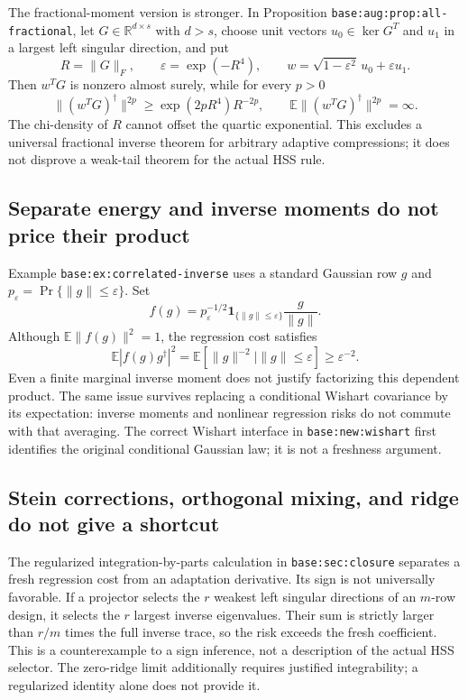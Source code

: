 \documentclass[11pt,oneside,openany,a4paper]{report}
\numberwithin{equation}{chapter}
\theoremstyle{definition}
\theoremstyle{remark}
\begin{document}
The fractional-moment version is stronger.  In Proposition
\texttt{base:aug:prop:all-fractional}, let $G\in\mathbb R^{d\times s}$
with $d>s$, choose unit vectors $u_0\in\ker G^T$ and $u_1$ in a largest
left singular direction, and put
\[
 R=\|G\|_F,\qquad \varepsilon=\exp(-R^4),\qquad
 w=\sqrt{1-\varepsilon^2}\,u_0+\varepsilon u_1.
\]
Then $w^TG$ is nonzero almost surely, while for every $p>0$
\[
 \|(w^TG)^\dagger\|^{2p}
 \ge \exp(2pR^4)R^{-2p},\qquad
 \mathbb E\|(w^TG)^\dagger\|^{2p}=\infty.
\]
The chi-density of $R$ cannot offset the quartic exponential.  This
excludes a universal fractional inverse theorem for arbitrary adaptive
compressions; it does not disprove a weak-tail theorem for the actual
HSS rule.

\subsection{Separate energy and inverse moments do not price their product}

Example \texttt{base:ex:correlated-inverse} uses a standard Gaussian row
$g$ and $p_\varepsilon=\Pr\{\|g\|\le\varepsilon\}$.  Set
\[
 f(g)=p_\varepsilon^{-1/2}\mathbf1_{\{\|g\|\le\varepsilon\}}
       \frac{g}{\|g\|}.
\]
Although $\mathbb E\|f(g)\|^2=1$, the regression cost satisfies
\[
 \mathbb E|f(g)g^\dagger|^2
 =\mathbb E[\|g\|^{-2}\mid\|g\|\le\varepsilon]
 \ge\varepsilon^{-2}.
\]
Even a finite marginal inverse moment does not justify factorizing this
dependent product.  The same issue survives replacing a conditional
Wishart covariance by its expectation: inverse moments and nonlinear
regression risks do not commute with that averaging.  The correct
Wishart interface in \texttt{base:new:wishart} first identifies the
original conditional Gaussian law; it is not a freshness argument.

\subsection{Stein corrections, orthogonal mixing, and ridge do not give a shortcut}

The regularized integration-by-parts calculation in
\texttt{base:sec:closure} separates a fresh regression cost from an
adaptation derivative.  Its sign is not universally favorable.  If a
projector selects the $r$ weakest left singular directions of an
$m$-row design, it selects the $r$ largest inverse eigenvalues.  Their
sum is strictly larger than $r/m$ times the full inverse trace, so the
risk exceeds the fresh coefficient.  This is a counterexample to a
sign inference, not a description of the actual HSS selector.  The
zero-ridge limit additionally requires justified integrability; a
regularized identity alone does not provide it.
\end{document}
